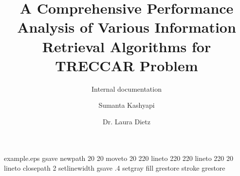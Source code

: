 %
%
%
%
%
\begin{filecontents*}{example.eps}
gsave
newpath
  20 20 moveto
  20 220 lineto
  220 220 lineto
  220 20 lineto
closepath
2 setlinewidth
gsave
  .4 setgray fill
grestore
stroke
grestore
\end{filecontents*}
%
\RequirePackage{fix-cm}
%
\documentclass[smallextended]{svjour3}       %
%
\smartqed  %
%
\usepackage{graphicx}
\usepackage{amssymb}
\usepackage{amsmath}
%
%
\usepackage{fixltx2e}
\usepackage[]{algorithm2e}
%
%
%


\title{A Comprehensive Performance Analysis of Various Information Retrieval Algorithms for TRECCAR Problem%
}
\subtitle{Internal documentation}


\author{Sumanta Kashyapi         \and
        Dr. Laura Dietz %
}



